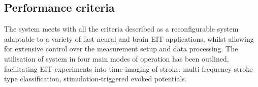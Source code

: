 \subsection{Performance criteria}
The system meets with all the criteria described as a reconfigurable system adaptable to a variety of fast neural and brain EIT applications, whilst allowing for extensive control over the measurement setup and data processing. The utilisation of system in four main modes of operation has been outlined, facilitating EIT experiments into time imaging of stroke, multi-frequency stroke type classification, stimulation-triggered evoked potentials. 